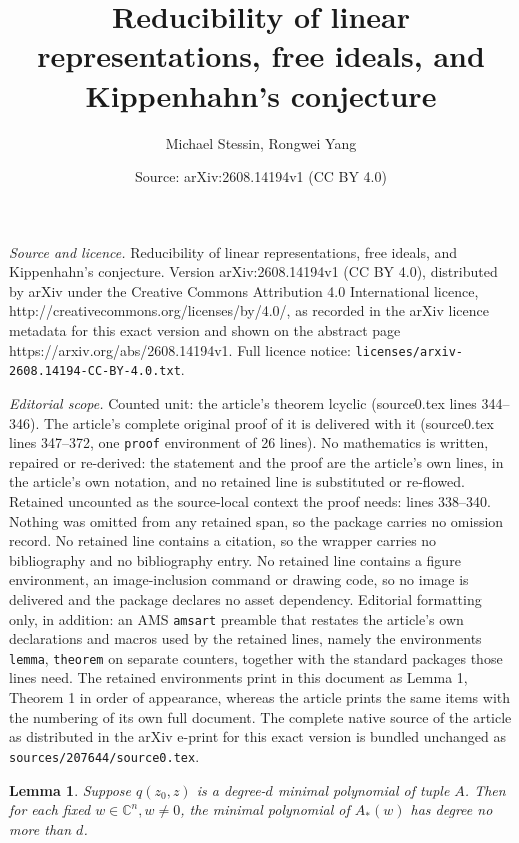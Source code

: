 \documentclass[10pt,a4paper]{amsart}
\title{Reducibility of linear representations, free ideals, and Kippenhahn's conjecture}
\author{Michael Stessin, Rongwei Yang}
\date{Source: arXiv:2608.14194v1 (CC BY 4.0)}
\newtheorem{lemma}{Lemma}
\newcommand{\C}{{\mathbb C}}
\begin{document}
\maketitle

\noindent\emph{Source and licence.} Reducibility of linear representations, free ideals, and Kippenhahn's conjecture. Version arXiv:2608.14194v1 (CC BY 4.0), distributed by arXiv under the Creative Commons Attribution 4.0 International licence, http://creativecommons.org/licenses/by/4.0/, as recorded in the arXiv licence metadata for this exact version and shown on the abstract page https://arxiv.org/abs/2608.14194v1. Full licence notice: \texttt{licenses/arxiv-2608.14194-CC-BY-4.0.txt}.\par\smallskip

\noindent\textit{Editorial scope.} Counted unit: the article's theorem lcyclic (source0.tex lines 344--346). The article's complete original proof of it is delivered with it (source0.tex lines 347--372, one \texttt{proof} environment of 26 lines). No mathematics is written, repaired or re-derived: the statement and the proof are the article's own lines, in the article's own notation, and no retained line is substituted or re-flowed.  Retained uncounted as the source-local context the proof needs: lines 338--340.  Nothing was omitted from any retained span, so the package carries no omission record.  No retained line contains a citation, so the wrapper carries no bibliography and no bibliography entry.  No retained line contains a figure environment, an image-inclusion command or drawing code, so no image is delivered and the package declares no asset dependency.  Editorial formatting only, in addition: an AMS \texttt{amsart} preamble that restates the article's own declarations and macros used by the retained lines, namely the environments \texttt{lemma}, \texttt{theorem} on separate counters, together with the standard packages those lines need.  The retained environments print in this document as Lemma 1, Theorem 1 in order of appearance, whereas the article prints the same items with the numbering of its own full document.  The complete native source of the article as distributed in the arXiv e-print for this exact version is bundled unchanged as \texttt{sources/207644/source0.tex}.
\begin{lemma}\label{minip}
Suppose $q(z_0,z)$ is a degree-$d$ minimal polynomial of tuple $A$. Then for each fixed $w\in \C^n, w\neq 0$, the minimal polynomial of $A_*(w)$ has degree no more than $d$.
\end{lemma}
\end{document}
